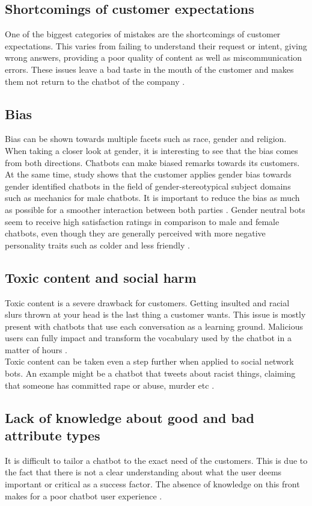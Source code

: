 \subsection{Shortcomings of customer expectations}
One of the biggest categories of mistakes are the shortcomings of customer expectations. This varies from failing to understand their request or intent, giving wrong answers, providing a poor quality of content as well as miscommunication errors. These issues leave a bad taste in the mouth of the customer and makes them not return to the chatbot of the company \citep{Adamopoulou2020, Duka2021, Nichifor2021, Sheehan2020, Margot}.

\subsection{Bias}
Bias can be shown towards multiple facets such as race, gender and religion. When taking a closer look at gender, it is interesting to see that the bias comes from both directions. Chatbots can make biased remarks towards its customers. At the same time, study shows that the customer applies gender bias towards gender identified chatbots in the field of gender-stereotypical subject domains such as mechanics for male chatbots. It is important to reduce the bias as much as possible for a smoother interaction between both parties \citep{Adamopoulou2020, McDonnell2019}. Gender neutral bots seem to receive high satisfaction ratings in comparison to male and female chatbots, even though they are generally perceived with more negative personality traits such as colder and less friendly \citep{McDonnell2019}.

\subsection{Toxic content and social harm}
Toxic content is a severe drawback for customers. Getting insulted and racial slurs thrown at your head is the last thing a customer wants. This issue is mostly present with chatbots that use each conversation as a learning ground. Malicious users can fully impact and transform the vocabulary used by the chatbot in a matter of hours \citep{Adamopoulou2020}.\\
Toxic content can be taken even a step further when applied to social network bots. An example might be a chatbot that tweets about racist things, claiming that someone has committed rape or abuse, murder etc \citep{Radziwil2021}.

\subsection{Lack of knowledge about good and bad attribute types}
It is difficult to tailor a chatbot to the exact need of the customers. This is due to the fact that there is not a clear understanding about what the user deems important or critical as a success factor. The absence of knowledge on this front makes for a poor chatbot user experience \citep{brandtzaeg2020}.

